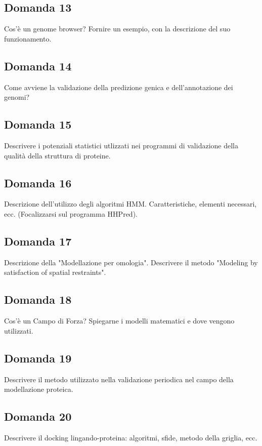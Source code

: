 \documentclass{article}
\begin{document}
\subsection*{Domanda 13}
Cos'è un genome browser? Fornire un esempio, con la descrizione del suo funzionamento.

\subsection*{Domanda 14}
Come avviene la validazione della predizione genica e dell'annotazione dei genomi?

\subsection*{Domanda 15}
Descrivere i potenziali statistici utlizzati nei programmi di validazione della qualità della struttura di proteine.

\subsection*{Domanda 16}
Descrizione dell'utilizzo degli algoritmi HMM. Caratteristiche, elementi necessari, ecc. (Focalizzarsi sul programma HHPred).

\subsection*{Domanda 17}
Descrizione della "Modellazione per omologia". Descrivere il metodo "Modeling by satisfaction of spatial restraints".

\subsection*{Domanda 18}
Cos'è un Campo di Forza? Spiegarne i modelli matematici e dove vengono utilizzati.

\subsection*{Domanda 19}
Descrivere il metodo utilizzato nella validazione periodica nel campo della modellazione proteica.

\subsection*{Domanda 20}
Descrivere il docking lingando-proteina: algoritmi, sfide, metodo della griglia, ecc.
\end{document}
